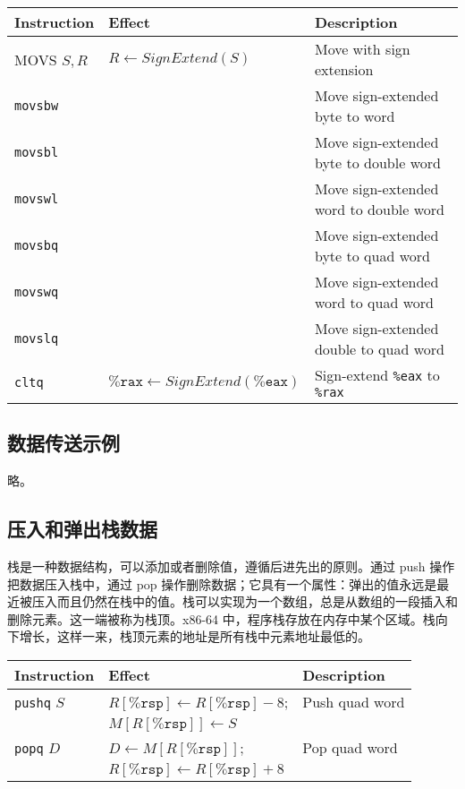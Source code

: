 \begin{table}[!ht]
    \centering
    \begin{tabular}{lll}
        \toprule
        Instruction & Effect & Description \\
        \midrule
        MOVS \quad $S, R$ & $R \leftarrow SignExtend(S)$ & Move with sign extension \\
        \quad\texttt{movsbw} & & Move sign-extended byte to word \\
        \quad\texttt{movsbl} & & Move sign-extended byte to double word \\
        \quad\texttt{movswl} & & Move sign-extended word to double word \\
        \quad\texttt{movsbq} & & Move sign-extended byte to quad word \\
        \quad\texttt{movswq} & & Move sign-extended word to quad word \\
        \quad\texttt{movslq} & & Move sign-extended double to quad word \\
        \texttt{cltq} & $\texttt{\%rax} \leftarrow SignExtend(\texttt{\%eax})$ & Sign-extend \texttt{\%eax} to \texttt{\%rax} \\
        \bottomrule
    \end{tabular}
\end{table}

\subsection{数据传送示例}

略。

\subsection{压入和弹出栈数据}

栈是一种数据结构，可以添加或者删除值，遵循后进先出的原则。通过 push 操作把数据压入栈中，通过 pop 操作删除数据；它具有一个属性：弹出的值永远是最近被压入而且仍然在栈中的值。栈可以实现为一个数组，总是从数组的一段插入和删除元素。这一端被称为栈顶。x86-64 中，程序栈存放在内存中某个区域。栈向下增长，这样一来，栈顶元素的地址是所有栈中元素地址最低的。

\begin{table}[!ht]
    \centering
    \begin{tabular}{lll}
        \toprule
        Instruction & Effect & Description \\
        \midrule
        \texttt{pushq} \quad $S$ & $R[\texttt{\%rsp}] \leftarrow R[\texttt{\%rsp}] - 8$; & Push quad word \\
        & $M[R[\texttt{\%rsp}]] \leftarrow S$ & \\
        \texttt{popq} \quad $D$ & $D \leftarrow M[R[\texttt{\%rsp}]]$; & Pop quad word \\
        & $R[\texttt{\%rsp}] \leftarrow R[\texttt{\%rsp}] + 8$ & \\
        \bottomrule
    \end{tabular}
\end{table}


